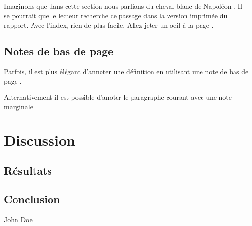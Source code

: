 \documentclass{heig-tb}
\begin{document}
Imaginons que dans cette section nous parlions du cheval blanc  de Napoléon . Il se pourrait que le lecteur recherche ce passage dans la version imprimée du rapport. Avec l'index, rien de plus facile. Allez jeter un oeil à la page \pageref{index}.

\section{Notes de bas de page}

Parfois, il est plus élégant d'annoter une définition en utilisant une note de bas de page \footnotemark.

Alternativement il est possible d'anoter le paragraphe courant avec une note marginale. 


\chapter{Discussion}
\section{Résultats}

\lipsum[10]

\section{Conclusion}

\lipsum[11]

\hspace{7cm}John Doe\par
\hspace{7cm}\begin{minipage}{5cm}

\end{minipage}

\clearpage

\appendix
\appendixpage
\addappheadtotoc



\backmatter


\printglossaries




\label{index}
\printindex
\end{document}
